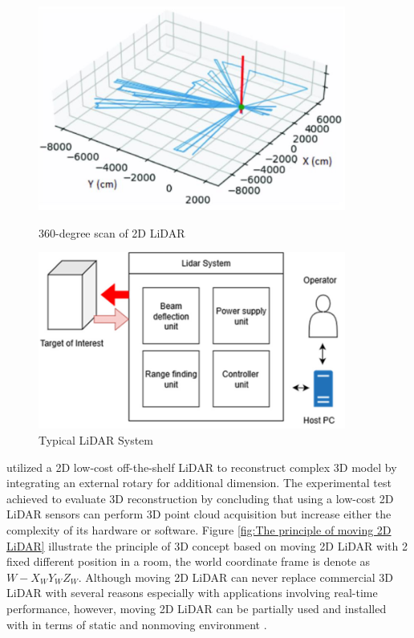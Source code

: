 \begin{figure}[H]
	\centering
	\begin{minipage}{0.5\textwidth}
		\centering
		\includegraphics[width=0.9\textwidth]{Figures/360-degree-lidar-scan.png} %
		\caption{360-degree scan of 2D LiDAR}
		\label{fig:360-dgree-lidar-scan}
	\end{minipage}\hfill
	\begin{minipage}{0.5\textwidth}
		\centering
		\includegraphics[width=0.9\textwidth]{Figures/Block-diagram-of-light-detection-and-ranging-LiDAR-system} %
		\caption{Typical LiDAR System}
		\label{fig:Typical LiDAR System}
	\end{minipage}
\end{figure}

\citet{kang2018} utilized a 2D low-cost off-the-shelf LiDAR to reconstruct complex 3D model by integrating an external rotary for additional dimension. The experimental test achieved to evaluate 3D reconstruction by concluding that using a low-cost 2D LiDAR sensors can  perform 3D point cloud acquisition but increase either the complexity of its hardware or software. Figure \ref{fig:The principle of moving 2D LiDAR} illustrate the principle of 3D concept based on moving 2D LiDAR with 2 fixed different position in a room, the world coordinate frame is denote as
\begin{math}
	W-X_{W}Y_{W}Z_{W}.
\end{math}
Although moving 2D LiDAR can never replace commercial 3D LiDAR with several reasons especially with applications involving real-time performance, however, moving 2D LiDAR can be partially used and installed with in terms of static and nonmoving environment \citep{bi2021}.

